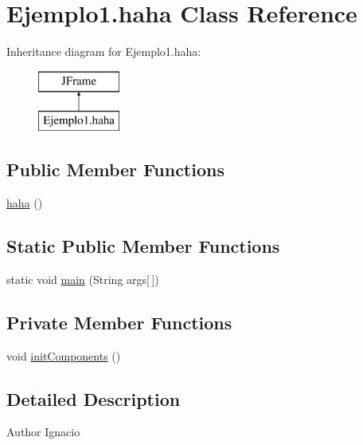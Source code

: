 \hypertarget{class_ejemplo1_1_1haha}{}\section{Ejemplo1.\+haha Class Reference}
\label{class_ejemplo1_1_1haha}
Inheritance diagram for Ejemplo1.\+haha\+:\begin{figure}[H]
\begin{center}
\leavevmode
\includegraphics[height=2.000000cm]{class_ejemplo1_1_1haha}
\end{center}
\end{figure}
\subsection*{Public Member Functions}
\begin{DoxyCompactItemize}
\item 
\mbox{\hyperlink{class_ejemplo1_1_1haha_a9cbbbf05676d8f04f61af8a8f380fb49}{haha}} ()
\end{DoxyCompactItemize}
\subsection*{Static Public Member Functions}
\begin{DoxyCompactItemize}
\item 
static void \mbox{\hyperlink{class_ejemplo1_1_1haha_a6bc2ebbd0d6117662d8f6b2bfefcce94}{main}} (String args\mbox{[}$\,$\mbox{]})
\end{DoxyCompactItemize}
\subsection*{Private Member Functions}
\begin{DoxyCompactItemize}
\item 
void \mbox{\hyperlink{class_ejemplo1_1_1haha_a816282daee68f4403ab51247af66a66b}{init\+Components}} ()
\end{DoxyCompactItemize}


\subsection{Detailed Description}
\begin{DoxyAuthor}{Author}
Ignacio 
\end{DoxyAuthor}


